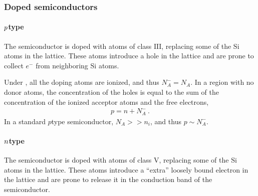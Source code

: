 \documentclass[letterpaper,10pt,english]{jupyterBook}
\begin{document}
\subsubsection{Doped semiconductors}
\label{\detokenize{ch/solid-state/semiconductors-equilibrium:doped-semiconductors}}\label{\detokenize{ch/solid-state/semiconductors-equilibrium:semiconductors-equilibrium-structure-doped}}

\paragraph{\protect\(p\protect\)\sphinxhyphen{}type}
\label{\detokenize{ch/solid-state/semiconductors-equilibrium:p-type}}\label{\detokenize{ch/solid-state/semiconductors-equilibrium:semiconductors-equilibrium-structure-doped-p-type}}
\sphinxAtStartPar
The semiconductor is doped with atoms of class \(\text{III}\), replacing some of the \(\text{Si}\) atoms in the lattice. These atoms introduce a hole in the lattice and are prone to collect \(e^-\) from neighboring \(\text{Si}\) atoms.

\sphinxAtStartPar
Under {\hyperref[\detokenize{ch/solid-state/semiconductors-equilibrium:semiconductors-equilibrium-structure-doped-full-ionization}]{}}, all the doping atoms are ionized, and thus \(N_A^- = N_A\). In a  region with no donor atoms, the concentration of the holes is equal to the sum of the concentration of the ionized acceptor atoms and the free electrons,
\begin{equation*}
\begin{split}p = n + N_A^- \ .\end{split}
\end{equation*}
\sphinxAtStartPar
In a standard \(p\)\sphinxhyphen{}type semiconductor, \(N_A >> n_i\), and thus \(p \sim N_A^-\).


\paragraph{\protect\(n\protect\)\sphinxhyphen{}type}
\label{\detokenize{ch/solid-state/semiconductors-equilibrium:n-type}}\label{\detokenize{ch/solid-state/semiconductors-equilibrium:semiconductors-equilibrium-structure-doped-n-type}}
\sphinxAtStartPar
The semiconductor is doped with atoms of class \(\text{V}\), replacing some of the \(\text{Si}\) atoms in the lattice. These atoms introduce a “extra” loosely bound electron in the lattice and are prone to release it in the conduction band of the semiconductor.
\end{document}
